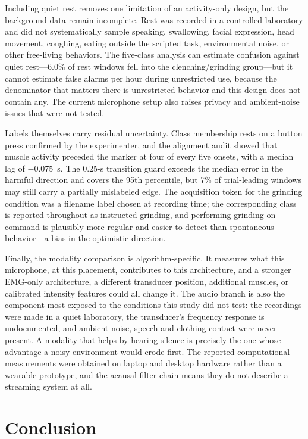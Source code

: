 \documentclass[pdflatex,sn-nature,iicol]{sn-jnl}
\begin{document}
Including quiet rest removes one limitation of an activity-only design, but the background data remain incomplete. Rest was recorded in a controlled laboratory and did not systematically sample speaking, swallowing, facial expression, head movement, coughing, eating outside the scripted task, environmental noise, or other free-living behaviors. The five-class analysis can estimate confusion against quiet rest---6.0\% of rest windows fell into the clenching/grinding group---but it cannot estimate false alarms per hour during unrestricted use, because the denominator that matters there is unrestricted behavior and this design does not contain any. The current microphone setup also raises privacy and ambient-noise issues that were not tested.

Labels themselves carry residual uncertainty. Class membership rests on a button press confirmed by the experimenter, and the alignment audit showed that muscle activity preceded the marker at four of every five onsets, with a median lag of $-0.075$~s. The 0.25-s transition guard exceeds the median error in the harmful direction and covers the 95th percentile, but 7\% of trial-leading windows may still carry a partially mislabeled edge. The acquisition token for the grinding condition was a filename label chosen at recording time; the corresponding class is reported throughout as instructed grinding, and performing grinding on command is plausibly more regular and easier to detect than spontaneous behavior---a bias in the optimistic direction.

Finally, the modality comparison is algorithm-specific. It measures what this microphone, at this placement, contributes to this architecture, and a stronger EMG-only architecture, a different transducer position, additional muscles, or calibrated intensity features could all change it. The audio branch is also the component most exposed to the conditions this study did not test: the recordings were made in a quiet laboratory, the transducer's frequency response is undocumented, and ambient noise, speech and clothing contact were never present. A modality that helps by hearing silence is precisely the one whose advantage a noisy environment would erode first. The reported computational measurements were obtained on laptop and desktop hardware rather than a wearable prototype, and the acausal filter chain means they do not describe a streaming system at all.

\section{Conclusion}
\end{document}
